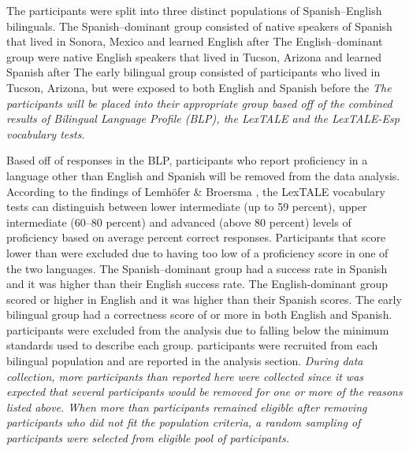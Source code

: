 The participants were split into three distinct populations of Spanish–English bilinguals. The Spanish–dominant group consisted of native speakers of Spanish that lived in Sonora, Mexico and learned English after %
The English–dominant group were native English speakers that lived in Tucson, Arizona and learned Spanish after %
The early bilingual group consisted of participants who lived in Tucson, Arizona, but were exposed to both English and Spanish before the %
\emph{The participants will be placed into their appropriate group based off of the combined results of Bilingual Language Profile (BLP), the LexTALE and the LexTALE-Esp vocabulary tests.} 

Based off of responses in the BLP, participants who report proficiency in a language other than English and Spanish will be removed from the data analysis. According to the findings of Lemhöfer \& Broersma \parencite*{Lemhofer2012-hz}, the LexTALE vocabulary tests can distinguish between lower intermediate (up to 59 percent), upper intermediate (60–80 percent) and advanced (above 80 percent) levels of proficiency based on average percent correct responses. Participants that score lower than %
were excluded due to having too low of a proficiency score in one of the two languages. The Spanish–dominant group had a %
success rate in Spanish and it was higher than their English success rate. The English-dominant group scored %
or higher in English and it was higher than their Spanish scores. The early bilingual group had a correctness score of %
or more in both English and Spanish. %
participants were excluded from the analysis due to falling below the minimum standards used to describe each group.%
participants were recruited from each bilingual population and are reported in the analysis section. \emph{During data collection, more participants than reported here were collected since it was expected that several participants would be removed for one or more of the reasons listed above. When more than %
participants remained eligible after removing participants who did not fit the population criteria, a random sampling of%
participants were selected from eligible pool of participants.}


